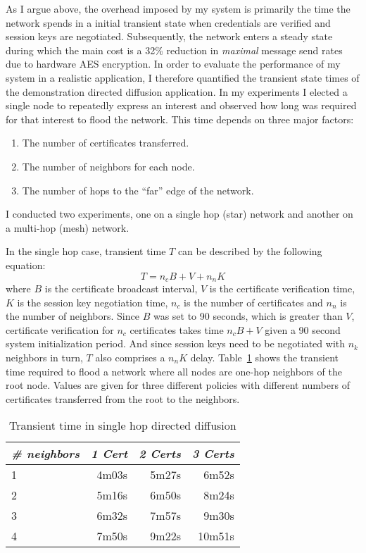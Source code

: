As I argue above, the overhead imposed by my system is primarily the time the network spends in
a initial transient state when credentials are verified and session keys are negotiated.
Subsequently, the network enters a steady state during which the main cost is a 32\% reduction
in \emph{maximal} message send rates due to hardware AES encryption. In order to evaluate the
performance of my system in a realistic application, I therefore quantified the transient state
times of the demonstration directed diffusion application. In my experiments I elected a single
node to repeatedly express an interest and observed how long was required for that interest to
flood the network. This time depends on three major factors:
\begin{enumerate}
\item The number of certificates transferred.
\item The number of neighbors for each node.
\item The number of hops to the ``far'' edge of the network.
\end{enumerate}
I conducted two experiments, one on a single hop (star) network and another on a multi-hop
(mesh) network.

In the single hop case, transient time $T$ can be described by the following equation:
\begin{displaymath}
T = n_c B + V + n_n K
\end{displaymath}
where $B$ is the certificate broadcast interval, $V$ is the certificate verification time, $K$
is the session key negotiation time, $n_c$ is the number of certificates and $n_n$ is the number
of neighbors. Since $B$ was set to 90 seconds, which is greater than $V$, certificate
verification for $n_c$ certificates takes time $n_c B + V$ given a 90 second system
initialization period. And since session keys need to be negotiated with $n_k$ neighbors in
turn, $T$ also comprises a $n_nK$ delay. Table~\ref{table-one-hop-transient} shows the transient
time required to flood a network where all nodes are one-hop neighbors of the root node. Values
are given for three different policies with different numbers of certificates transferred from
the root to the neighbors.

\begin{table}[tbhp]
  \newcommand\T{\rule{0pt}{2.1ex}}
  \centering
  \caption{Transient time in single hop directed diffusion}
  {
  \begin{tabular}{|l|r|r|r|} \hline
    \textit{\# neighbors} \T & \textit{1 Cert }
                             & \textit{2 Certs}
                             & \textit{3 Certs} \\ \hline \hline

    1 \T &  4m03s & 5m27s &  6m52s \\ \hline
    2 \T &  5m16s & 6m50s &  8m24s \\ \hline
    3 \T &  6m32s & 7m57s &  9m30s \\ \hline
    4 \T &  7m50s & 9m22s & 10m51s \\ \hline
  \end{tabular}
  }
  \label{table-one-hop-transient}
\end{table}

